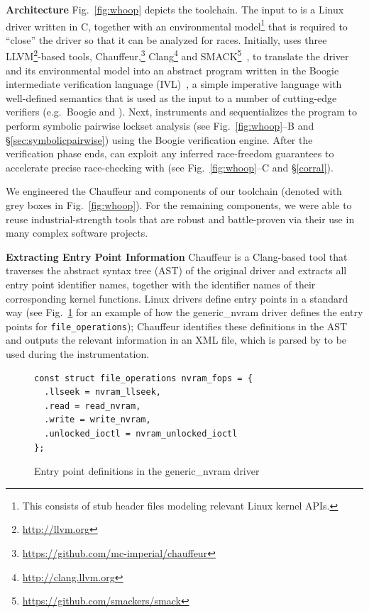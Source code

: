 \noindent\textbf{Architecture }
%
Fig.~\ref{fig:whoop} depicts the \whoop toolchain. The input to \whoop is a Linux driver written in C, together with an environmental model\footnote{This consists of stub header files modeling relevant Linux kernel APIs.} that is required to ``close'' the driver so that it can be analyzed for races. Initially, \whoop uses three LLVM\footnote{\url{http://llvm.org}}-based tools, Chauffeur,\footnote{\url{https://github.com/mc-imperial/chauffeur}} Clang\footnote{\url{http://clang.llvm.org}} and SMACK\footnote{\url{https://github.com/smackers/smack}}~\cite{rakamaric2014smack}, to translate the driver and its environmental model into an abstract program written in the Boogie intermediate verification language (IVL)~\cite{deline2005boogiepl}, a simple imperative language with well-defined semantics that is used as the input to a number of cutting-edge verifiers (e.g.\ Boogie and \corral). Next, \whoop instruments and sequentializes the program to perform symbolic pairwise lockset analysis (see Fig.~\ref{fig:whoop}--B and \S\ref{sec:symbolicpairwise}) using the Boogie verification engine. After the verification phase ends, \whoop can exploit any inferred race-freedom guarantees to accelerate precise race-checking with \corral (see Fig.~\ref{fig:whoop}--C and \S\ref{corral}).

We engineered the Chauffeur and \whoop components of our toolchain (denoted with grey boxes in Fig.~\ref{fig:whoop}).  For the remaining components, we were able to reuse industrial-strength tools that are robust and battle-proven via their use in many complex software projects.

\noindent\textbf{Extracting Entry Point Information }
%
Chauffeur is a Clang-based tool that traverses the abstract syntax tree (AST) of the original driver and extracts all entry point identifier names, together with the identifier names of their corresponding kernel functions. Linux drivers define entry points in a standard way (see Fig.~\ref{fig:entrypoints} for an example of how the generic\_nvram driver defines the entry points for \texttt{file\_operations}); Chauffeur identifies these definitions in the AST and outputs the relevant information in an XML file, which is parsed by \whoop to be used during the instrumentation.

\begin{figure}[t]
\begin{lstlisting}
const struct file_operations nvram_fops = {
  .llseek = nvram_llseek,
  .read = read_nvram,
  .write = write_nvram,
  .unlocked_ioctl = nvram_unlocked_ioctl
};
\end{lstlisting}
\caption{Entry point definitions in the generic\_nvram driver}
\label{fig:entrypoints}
\end{figure}

